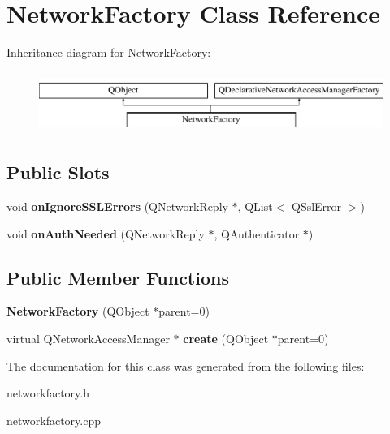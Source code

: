 \hypertarget{classNetworkFactory}{\section{Network\-Factory Class Reference}
\label{classNetworkFactory}
}
Inheritance diagram for Network\-Factory\-:\begin{figure}[H]
\begin{center}
\leavevmode
\includegraphics[height=2.000000cm]{classNetworkFactory}
\end{center}
\end{figure}
\subsection*{Public Slots}
\begin{DoxyCompactItemize}
\item 
\hypertarget{classNetworkFactory_abd29b95726eecc9d617b6585ce2fcb03}{void {\bfseries on\-Ignore\-S\-S\-L\-Errors} (Q\-Network\-Reply $\ast$, Q\-List$<$ Q\-Ssl\-Error $>$)}\label{classNetworkFactory_abd29b95726eecc9d617b6585ce2fcb03}

\item 
\hypertarget{classNetworkFactory_ae9078cc80c6fe15c0121d2c9aea489da}{void {\bfseries on\-Auth\-Needed} (Q\-Network\-Reply $\ast$, Q\-Authenticator $\ast$)}\label{classNetworkFactory_ae9078cc80c6fe15c0121d2c9aea489da}

\end{DoxyCompactItemize}
\subsection*{Public Member Functions}
\begin{DoxyCompactItemize}
\item 
\hypertarget{classNetworkFactory_aac6aff662a45cc52031ec39f1631be3d}{{\bfseries Network\-Factory} (Q\-Object $\ast$parent=0)}\label{classNetworkFactory_aac6aff662a45cc52031ec39f1631be3d}

\item 
\hypertarget{classNetworkFactory_a3d48936e4b8f27a60b8277bc52b2eb9d}{virtual Q\-Network\-Access\-Manager $\ast$ {\bfseries create} (Q\-Object $\ast$parent=0)}\label{classNetworkFactory_a3d48936e4b8f27a60b8277bc52b2eb9d}

\end{DoxyCompactItemize}


The documentation for this class was generated from the following files\-:\begin{DoxyCompactItemize}
\item 
networkfactory.\-h\item 
networkfactory.\-cpp\end{DoxyCompactItemize}
